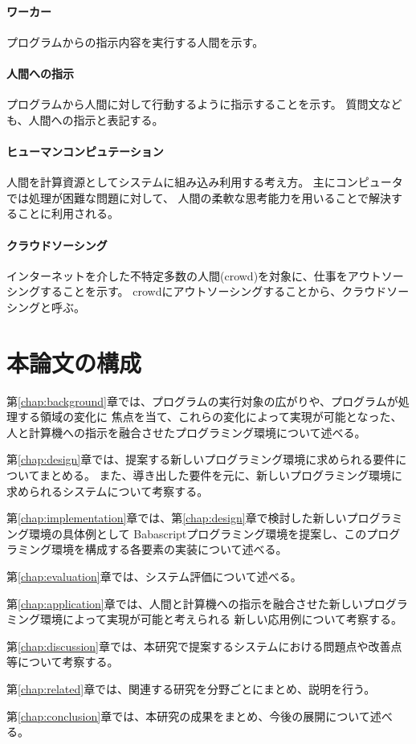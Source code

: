 \paragraph{ワーカー}\label{ux30efux30fcux30abux30fc}

プログラムからの指示内容を実行する人間を示す。

\paragraph{人間への指示}\label{ux4ebaux9593ux3078ux306eux6307ux793a}

プログラムから人間に対して行動するように指示することを示す。
質問文なども、人間への指示と表記する。

\paragraph{ヒューマンコンピュテーション}\label{ux30d2ux30e5ux30fcux30deux30f3ux30b3ux30f3ux30d4ux30e5ux30c6ux30fcux30b7ux30e7ux30f3}

人間を計算資源としてシステムに組み込み利用する考え方。
主にコンピュータでは処理が困難な問題に対して、
人間の柔軟な思考能力を用いることで解決することに利用される。

\paragraph{クラウドソーシング}\label{ux30afux30e9ux30a6ux30c9ux30bdux30fcux30b7ux30f3ux30b0}

インターネットを介した不特定多数の人間(crowd)を対象に、仕事をアウトソーシングすることを示す。
crowdにアウトソーシングすることから、クラウドソーシングと呼ぶ。

\section{本論文の構成}\label{ux672cux8ad6ux6587ux306eux69cbux6210}

第\ref{chap:background}章では、プログラムの実行対象の広がりや、プログラムが処理する領域の変化に
焦点を当て、これらの変化によって実現が可能となった、人と計算機への指示を融合させたプログラミング環境について述べる。

第\ref{chap:design}章では、提案する新しいプログラミング環境に求められる要件についてまとめる。
また、導き出した要件を元に、新しいプログラミング環境に求められるシステムについて考察する。

第\ref{chap:implementation}章では、第\ref{chap:design}章で検討した新しいプログラミング環境の具体例として
Babascriptプログラミング環境を提案し、このプログラミング環境を構成する各要素の実装について述べる。

第\ref{chap:evaluation}章では、システム評価について述べる。

第\ref{chap:application}章では、人間と計算機への指示を融合させた新しいプログラミング環境によって実現が可能と考えられる
新しい応用例について考察する。

第\ref{chap:discussion}章では、本研究で提案するシステムにおける問題点や改善点等について考察する。

第\ref{chap:related}章では、関連する研究を分野ごとにまとめ、説明を行う。

第\ref{chap:conclusion}章では、本研究の成果をまとめ、今後の展開について述べる。
